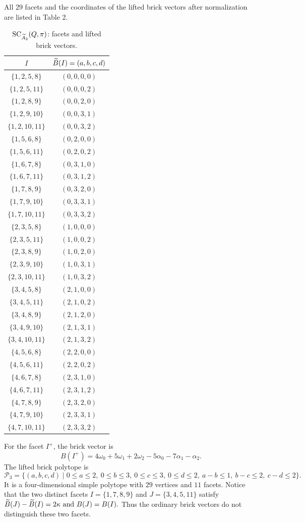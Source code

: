 All $29$ facets and the coordinates of the lifted brick vectors after normalization are listed in Table 2.
\begin{table}[H]
\centering
\caption{$\operatorname{SC}_{\widetilde A_2}(Q,\pi)$: facets and lifted brick vectors.}
\label{tab:int-P3-vertices}
\medskip
\small
\begin{tabular}{@{}cc@{}}
\toprule
$I$ & $\widetilde B(I)=(a,b,c,d)$\\
\midrule
$\{1,2,5,8\}$ & $(0,0,0,0)$\\
$\{1,2,5,11\}$ & $(0,0,0,2)$\\
$\{1,2,8,9\}$ & $(0,0,2,0)$\\
$\{1,2,9,10\}$ & $(0,0,3,1)$\\
$\{1,2,10,11\}$ & $(0,0,3,2)$\\
$\{1,5,6,8\}$ & $(0,2,0,0)$\\
$\{1,5,6,11\}$ & $(0,2,0,2)$\\
$\{1,6,7,8\}$ & $(0,3,1,0)$\\
$\{1,6,7,11\}$ & $(0,3,1,2)$\\
$\{1,7,8,9\}$ & $(0,3,2,0)$\\
$\{1,7,9,10\}$ & $(0,3,3,1)$\\
$\{1,7,10,11\}$ & $(0,3,3,2)$\\
$\{2,3,5,8\}$ & $(1,0,0,0)$\\
$\{2,3,5,11\}$ & $(1,0,0,2)$\\
$\{2,3,8,9\}$ & $(1,0,2,0)$\\
$\{2,3,9,10\}$ & $(1,0,3,1)$\\
$\{2,3,10,11\}$ & $(1,0,3,2)$\\
$\{3,4,5,8\}$ & $(2,1,0,0)$\\
$\{3,4,5,11\}$ & $(2,1,0,2)$\\
$\{3,4,8,9\}$ & $(2,1,2,0)$\\
$\{3,4,9,10\}$ & $(2,1,3,1)$\\
$\{3,4,10,11\}$ & $(2,1,3,2)$\\
$\{4,5,6,8\}$ & $(2,2,0,0)$\\
$\{4,5,6,11\}$ & $(2,2,0,2)$\\
$\{4,6,7,8\}$ & $(2,3,1,0)$\\
$\{4,6,7,11\}$ & $(2,3,1,2)$\\
$\{4,7,8,9\}$ & $(2,3,2,0)$\\
$\{4,7,9,10\}$ & $(2,3,3,1)$\\
$\{4,7,10,11\}$ & $(2,3,3,2)$\\
\bottomrule
\end{tabular}
\end{table}

For the facet $I^+$, the brick vector is
\[
B(I^+)=4\omega_0+5\omega_1+2\omega_2-5\alpha_0-7\alpha_1-\alpha_2.
\]
The lifted brick polytope is
\begin{equation}\label{eq:int-P3}
\mathcal P_3=\{(a,b,c,d)\mid 0\le a\le2,\ 0\le b\le3,\ 0\le c\le3,\ 0\le d\le2,\
a-b\le1,\ b-c\le2,\ c-d\le2\}.
\end{equation}
It is a four-dimensional simple polytope with $29$ vertices and $11$ facets. Notice that the two distinct facets $I=\{1,7,8,9\}$ and $J=\{3,4,5,11\}$ satisfy $\widetilde B(J)-\widetilde B(I)=2\kappa \text{ and } B(J)=B(I).$ Thus the ordinary brick vectors do not distinguish these two facets.


